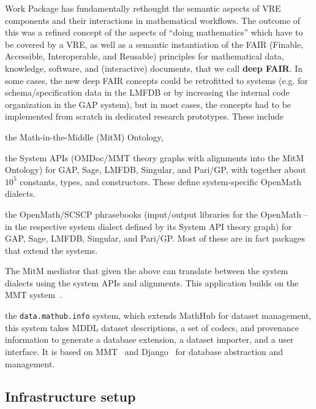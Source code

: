 \documentclass{deliverablereport}
\def\dmh{\texttt{data.mathub.info}\xspace}
\begin{document}
\begin{newpart}
Work Package  has fundamentally rethought the semantic aspects of VRE components and their interactions in mathematical workflows.
The outcome of this was a refined concept of the aspects of ``doing mathematics'' which have to be covered by a VRE, as well as a semantic instantiation of the FAIR (Finable, Accessible, Interoperable, and Reusable) principles for mathematical data, knowledge, software, and (interactive) documents, that we call \textbf{deep FAIR}.
In some cases, the new deep FAIR concepts could be retrofitted to \pn systems (e.g. for schema/specification data in the LMFDB or by increasing the internal code organization in the GAP system), but in most cases, the concepts had to be implemented from scratch in dedicated research prototypes. These include
\begin{compactenum}
\item the Math-in-the-Middle (MitM) Ontology,
\item the System APIs (OMDoc/MMT theory graphs with alignments into the MitM Ontology) for GAP, Sage, LMFDB, Singular, and Pari/GP, with together about $10^5$ constants, types, and constructors. These define system-specific OpenMath dialects.
\item the OpenMath/SCSCP phrasebooks (input/output libraries for the OpenMath -- in the respective system dialect defined by its System API theory graph) for GAP, Sage, LMFDB, Singular, and Pari/GP. Most of these are in fact packages that extend the systems.
  \item The MitM mediator that  given the above can translate between the system dialects using the system APIs and alignments. This application builds on the MMT system~\cite{uniformal:on}.
  \item the \dmh system, which extends MathHub for dataset management, this system takes MDDL dataset descriptions, a set of codecs, and provenance information to generate a database extension, a dataset importer, and a user interface.  It is based on MMT~\cite{uniformal:on} and Django~\cite{django:on} for database abstraction and management.
  \end{compactenum}
\end{newpart}

\subsection{Infrastructure setup}

\end{document}
